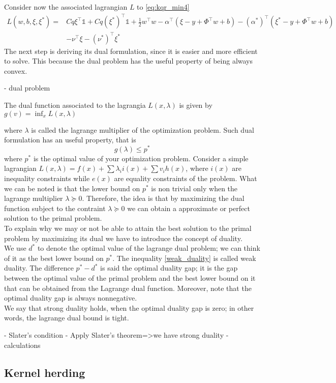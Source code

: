 Consider now the associated lagrangian $L$ to \ref{eq:kqr_min4}
\begin{equation}\label{eq:kqr_min5}
    \begin{aligned}
    L(w,b,\xi,\xi^*)= & C q \xi^\intercal \mathbb{1}+ C q (\xi^*)^\intercal \mathbb{1}+ \frac{1}{2}w^\intercal w- \alpha^\intercal(\xi - y+\Phi^\intercal w +b)
    - (\alpha^*)^\intercal(\xi^* -y+\Phi^\intercal w +b)
    \\
    & -\nu^\intercal \xi - (\nu^*)^\intercal \xi^*
\end{aligned}
\end{equation}
The next step is deriving its dual formulation, since it is easier and more efficient to solve. This because the dual problem has the useful property of being always convex.

- dual problem
\begin{definition}
    The dual function associated to the lagrangia $L(x,\lambda)$ is given by $g(v)=\inf_x L(x,\lambda)$
\end{definition}
where $\lambda$ is called the lagrange multiplier of the optimization problem. Such dual formulation has an useful property, that is \begin{equation}\label{weak_duality}
    g(\lambda)\leq p^*
\end{equation}
where $p^*$ is the optimal value of your optimization problem.
Consider a simple lagrangian $L(x,\lambda)=f(x)+\sum \lambda_i i(x) +\sum v_i h(x)$, where $i(x)$ are inequality constraints while $e(x)$ are equality constraints of the problem. What we can be noted is that the lower bound on $p^*$ is non trivial only when the lagrange multiplier $\lambda \succeq 0$. Therefore, the idea is that by maximizing the dual function subject to the contraint $\lambda \succeq 0$ we can obtain a approximate or perfect solution to the primal problem.
\\
To explain why we may or not be able to attain the best solution to the primal problem by maximizing its dual we have to introduce the concept of duality.
\\
We use $d^*$ to denote the optimal value of the lagrange dual problem; we can think of it as the best lower bound on $p^*$. The inequality \ref{weak_duality} is called weak duality. The difference $p^*-d^*$ is said the optimal duality gap; it is the gap between the optimal value of the primal problem and the best lower bound on it that can be obtained from the Lagrange dual function. Moreover, note that the optimal duality gap is always nonnegative.
\\
We say that strong duality holds, when the optimal duality gap is zero; in other words, the lagrange dual bound is tight.

- Slater's condition
- Apply Slater's theorem=>we have strong duality
- calculations
\subsection{Kernel herding}